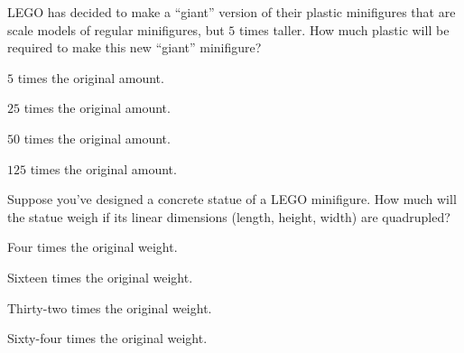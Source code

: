 \documentclass{ximera}
\author{Bart Snapp}
\begin{document}
\maketitle








\begin{exercise}
  LEGO has decided to make a ``giant'' version of their plastic
  minifigures that are scale models of regular minifigures, but $5$
  times taller.  How much plastic will be required to make this new
  ``giant'' minifigure?
    \begin{enumerate}\begin{multicols}{2}
    \item $5$ times the original amount.
    \item $25$ times the original amount.
    \item $50$ times the original amount.
    \item $125$ times the original amount.
    \end{multicols}
  \end{enumerate}%
\end{exercise}







\begin{exercise}
  Suppose you've designed a concrete statue of a LEGO minifigure.  How
  much will the statue weigh if its linear dimensions (length,
  height, width) are quadrupled?
  \begin{enumerate}\begin{multicols}{2}
    \item Four times the original weight.
    \item Sixteen times the original weight.
    \item Thirty-two times the original weight.
    \item Sixty-four times the original weight.
    \end{multicols}
  \end{enumerate}
\end{exercise}
\end{document}
